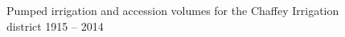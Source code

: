 \documentclass[a4paper, titlepage, 12pt]{article}\usepackage[]{graphicx}\usepackage[]{color}
\newenvironment{knitrout}{}{} %
\begin{document}
\begin{sffamily}
\begin{appendices}
\begin{figure}
\begin{knitrout}
\end{knitrout}
\caption{Pumped irrigation and accession volumes for the Chaffey Irrigation district 1915 -- 2014}
\label{fig07}
\end{figure}
\end{appendices}


\end{sffamily}
\end{document}
